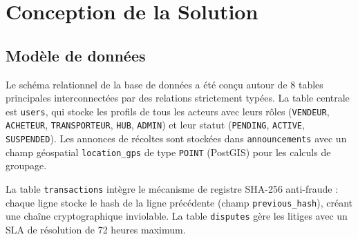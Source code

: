 \documentclass[12pt,a4paper]{report}
\begin{document}
\section{Conception de la Solution}

\subsection{Modèle de données}

Le schéma relationnel de la base de données a été conçu autour de 8 tables principales interconnectées par des relations strictement typées. La table centrale est \texttt{users}, qui stocke les profils de tous les acteurs avec leurs rôles (\texttt{VENDEUR}, \texttt{ACHETEUR}, \texttt{TRANSPORTEUR}, \texttt{HUB}, \texttt{ADMIN}) et leur statut (\texttt{PENDING}, \texttt{ACTIVE}, \texttt{SUSPENDED}). Les annonces de récoltes sont stockées dans \texttt{announcements} avec un champ géospatial \texttt{location\_gps} de type \texttt{POINT} (PostGIS) pour les calculs de groupage.

La table \texttt{transactions} intègre le mécanisme de registre SHA-256 anti-fraude : chaque ligne stocke le hash de la ligne précédente (champ \texttt{previous\_hash}), créant une chaîne cryptographique inviolable. La table \texttt{disputes} gère les litiges avec un SLA de résolution de 72 heures maximum.
\end{document}
